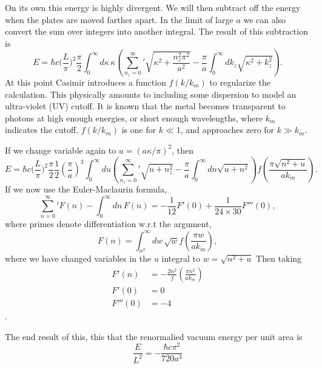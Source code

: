 On its own this energy is highly divergent.  
We will then subtract off the energy when the plates are moved farther apart.
In the limit of large $a$ we can also convert the sum over integers into 
another integral.  
The result of this subtraction is
\begin{equation}
E = \hbar c\bigg(\frac{L}{\pi}\bigg)^2\frac{\pi}{2}\int_0^\infty d\kappa\,\kappa
 \left({\sum_{n_z=0}^\infty}'\sqrt{\kappa^2+\frac{n_z^2\pi^2}{a^2}}
-\frac{\pi}{a}\int_0^\infty dk_z\sqrt{\kappa^2+k_z^2}\right).
\end{equation}
At this point Casimir introduces a function $f(k/k_m)$ to regularize the calculation.
This physically amounts to including some dispersion to model an 
ultra-violet (UV) cutoff.  
It is known  that the metal becomes transparent to 
photons at high enough energies, or short enough wavelengths,
 where $k_m$ indicates the cutoff.
  $f(k/k_m)$ is one for $k\ll 1$, and approaches zero for $k\gg k_m$.  

If we change variable again to $u=(a\kappa/\pi)^2$, then
\begin{equation}
E = \hbar c\bigg(\frac{L}{\pi}\bigg)^2\frac{\pi}{2}\frac{1}{2}
\left(\frac{\pi}{a}\right)^3\int_0^\infty du 
\left({\sum_{n_z=0}^\infty}'\sqrt{u+n_z^2}-\frac{\pi}{a}\int_0^\infty dn\sqrt{u+n^2}\right)
f\left(\frac{\pi\sqrt{n^2+u}}{a k_m}\right).
\end{equation}
If we now use the Euler-Maclaurin formula,
\begin{equation}
{\sum_{n=0}^\infty}' F(n)-\int_0^\infty dn\, F(n)
=-\frac{1}{12}F'(0)+\frac{1}{24\times 30}F'''(0),
\end{equation}
where primes denote differentiation w.r.t the argument, 
\begin{equation}
F(n)=\int_{n^2}^\infty dw\, \sqrt{w}f\left(\frac{\pi w}{ak_m}\right),
\end{equation}
where we have changed variables in the $u$ integral to $w = \sqrt{n^2+u}$
Then taking 
\begin{align}
F'(n) & = -\frac{2n^2}f\left(\frac{\pi n^2}{a k_m}\right)\\
F'(0) & = 0\\
F'''(0) & = -4
\end{align}
.

The end result of this, this that the renormalied vacuum energy per unit area is
\begin{equation}
\frac{E}{L^2} = -\frac{\hbar c\pi^2}{720 a^3}
\end{equation}

